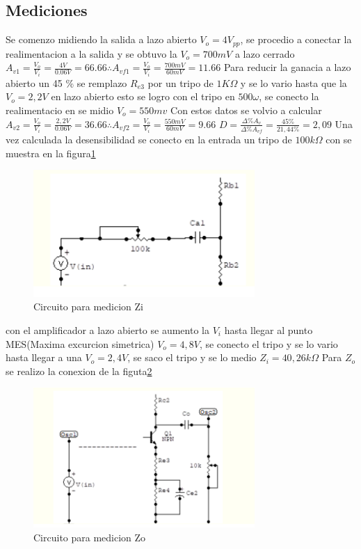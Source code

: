 \documentclass[12pt, letterpaper]{article}
\begin{document}
\subsection{Mediciones}
Se comenzo midiendo la salida a lazo abierto $V_o=4V_{pp}$, se procedio a conectar la realimentacion a la salida y se obtuvo la $V_o=700mV$ a lazo cerrado
\singlespacing
$A_{v1}=\frac{V_o}{V_{i}}=\frac{4V}{0.06V}=66.66\therefore A_{vf1}=\frac{V_o}{V_{i}}=\frac{700mV}{60mV}=11.66$
\singlespacing
Para reducir la ganacia a lazo abierto un 45 \% se remplazo $R_{e3}$ por un tripo de $1K\Omega$ y se lo vario hasta que la $V_o=2,2V$ en lazo abierto esto se logro con el tripo en $500\omega$, se conecto la realimentacio en se midio $V_o=550mv$
\singlespacing
Con estos datos se volvio a calcular $A_{v2}=\frac{V_o}{V_{i}}=\frac{2,2V}{0.06V}=36.66\therefore A_{vf2}=\frac{V_o}{V_{i}}=\frac{550mV}{60mV}=9.66$
\singlespacing
$D=\frac{\Delta \% A_v}{\Delta \% A_{vf}}=\frac{45\%}{21,44\%}=2,09$
\singlespacing
Una vez calculada la desensibilidad se conecto en la entrada un tripo de $100k\Omega$ con se muestra en la figura\ref{fig:4.2}
\singlespacing
\begin{figure}[h]
	\centering
	\includegraphics[width=0.75\textwidth]{Imagenes/zi.png}
	\caption{Circuito para medicion Zi}
	\label{fig:4.2}
\end{figure}
con el amplificador a lazo abierto se aumento la $V_i$ hasta llegar al punto MES(Maxima excurcion simetrica) $V_o=4,8V$, se conecto el tripo y se lo vario hasta llegar a una $V_o=2,4V$, se saco el tripo y se lo medio
\singlespacing
$Z_i=40,26k\Omega$
\singlespacing
Para $Z_o$ se realizo la conexion de la figuta\ref{fig:4.3}
\singlespacing
\begin{figure}[h]
	\centering
	\includegraphics[width=0.75\textwidth]{Imagenes/zo.png}
	\caption{Circuito para medicion Zo}
	\label{fig:4.3}
\end{figure}
\label{LastPage}
\end{document}
